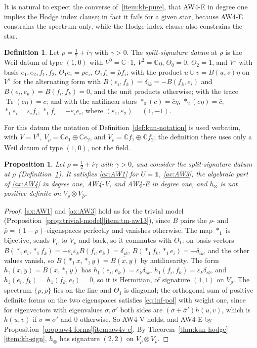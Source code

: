 \documentclass[11pt]{amsart}
\theoremstyle{plain}
\newtheorem{proposition}[theorem]{Proposition}
\theoremstyle{definition}
\newtheorem{definition}[theorem]{Definition}
\theoremstyle{remark}
\numberwithin{equation}{section}
\newcommand{\C}{\mathbb{C}}
\DeclareMathOperator{\Tr}{Tr}
\begin{document}
It is natural to expect the converse of~\ref{item:kh-pure}, that AW4-E
in degree one implies the Hodge index clause; in fact it fails for a
given star, because AW4-E constrains the spectrum only, while the Hodge
index clause also constrains the star.

\begin{definition}\label{def:split-datum}
Let $\rho=\tfrac12+i\gamma$ with $\gamma>0$. The \emph{split-signature
datum} at $\rho$ is the Weil datum of type $(1,0)$ with $V^0=\C\cdot1$,
$V^2=\C\eta$, $\Theta_0=0$, $\Theta_2=1$, and $V^1$ with basis
$e_1,e_2,f_1,f_2$, $\Theta_1e_i=\rho e_i$, $\Theta_1f_i=\bar\rho f_i$;
with the product $u\cup v=B(u,v)\eta$ on $V^1$ for the alternating form
with $B(e_i,f_k)=\delta_{ik}=-B(f_k,e_i)$ and $B(e_i,e_k)=B(f_i,f_k)=0$,
and the unit products otherwise; with the trace $\Tr(c\eta)=c$; and
with the antilinear stars $*_0(c)=\bar c\eta$, $*_2(c\eta)=\bar c$,
$*_1e_i=\varepsilon_if_i$, $*_1f_i=-\varepsilon_ie_i$, where
$(\varepsilon_1,\varepsilon_2)=(1,-1)$.
\end{definition}

For this datum the notation of Definition~\ref{def:kun-notation} is used
verbatim, with $V=V^1$, $V_\rho=\C e_1\oplus\C e_2$, and
$V_{\bar\rho}=\C f_1\oplus\C f_2$; the definition there uses only a Weil
datum of type $(1,0)$, not the field.

\begin{proposition}\label{prop:kun-hodge-strict}
Let $\rho=\tfrac12+i\gamma$ with $\gamma>0$, and consider the
split-signature datum at $\rho$ (Definition~\ref{def:split-datum}).
It satisfies \ref{ax:AW1} for $U=\mathbb 1$, \ref{ax:AW3}, the
algebraic part of \ref{ax:AW4} in degree one, AW4-V, and AW4-E in degree
one, and $h_\otimes$ is not positive definite on
$V_\rho\otimes V_{\bar\rho}$.
\end{proposition}

\begin{proof}
\ref{ax:AW1} and \ref{ax:AW3} hold as for the trivial model
(Proposition~\ref{prop:trivial-model}\ref{item:tm-aw13}), since $B$
pairs the $\rho$- and $\bar\rho=(1-\rho)$-eigenspaces perfectly and
vanishes otherwise. The map $*_1$ is bijective, sends $V_\rho$ to
$V_{\bar\rho}$ and back, so it commutes with $\Theta_1$; on basis
vectors $B(*_1e_i,*_1f_k)=-\varepsilon_i\varepsilon_kB(f_i,e_k)=
\delta_{ik}$, $B(*_1f_k,*_1e_i)=-\delta_{ik}$, and the other values
vanish, so $B(*_1x,*_1y)=\overline{B(x,y)}$ by antilinearity. The form
$h_1(x,y)=B(x,*_1y)$ has $h_1(e_i,e_k)=\varepsilon_k\delta_{ik}$,
$h_1(f_i,f_k)=\varepsilon_k\delta_{ik}$, and $h_1(e_i,f_k)=h_1(f_k,e_i)=0$,
so it is Hermitian, of signature $(1,1)$ on $V_\rho$. The spectrum
$\{\rho,\bar\rho\}$ lies on the line and $\Theta_1$ is diagonal; the
orthogonal sum of positive definite forms on the two eigenspaces
satisfies \eqref{eq:inf-pol} with weight one, since for eigenvectors
with eigenvalues $\sigma,\sigma'$ both sides are $(\sigma+\bar\sigma')
h(u,v)$, which is $h(u,v)$ if $\sigma=\sigma'$ and $0$ otherwise. So
AW4-V holds, and AW4-E by
Proposition~\ref{prop:aw4-forms}\ref{item:aw4v-e}. By
Theorem~\ref{thm:kun-hodge}\ref{item:kh-sign}, $h_\otimes$ has
signature $(2,2)$ on $V_\rho\otimes V_{\bar\rho}$.
\end{proof}
\end{document}
